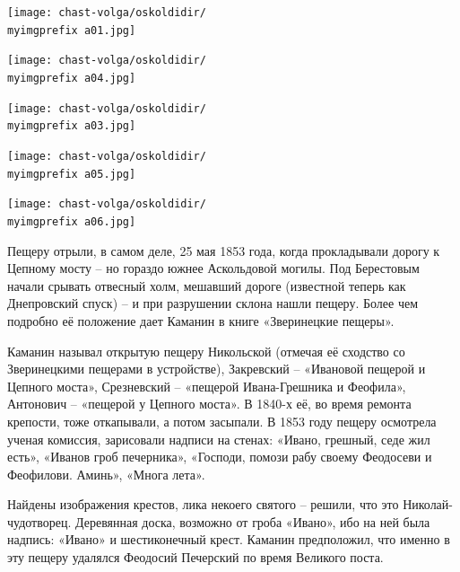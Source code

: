 \newpage
\vspace*{\fill}
\begin{center}
\texttt{[image: chast-volga/oskoldidir/\\myimgprefix a01.jpg]}
\end{center}

\begin{center}
\texttt{[image: chast-volga/oskoldidir/\\myimgprefix a04.jpg]}
\end{center}
\vspace*{\fill}
\newpage
\vspace*{\fill}
\begin{center}
\texttt{[image: chast-volga/oskoldidir/\\myimgprefix a03.jpg]}
\end{center}

\begin{center}
\texttt{[image: chast-volga/oskoldidir/\\myimgprefix a05.jpg]}
\end{center}
\vspace*{\fill}
\newpage

\begin{center}
\texttt{[image: chast-volga/oskoldidir/\\myimgprefix a06.jpg]}
\end{center}

Пещеру отрыли, в самом деле, 25 мая 1853 года, когда прокладывали дорогу к Цепному мосту – но гораздо южнее Аскольдовой могилы. Под Берестовым начали срывать отвесный холм, мешавший дороге (известной теперь как Днепровский спуск) – и при разрушении склона нашли пещеру. Более чем подробно её положение дает Каманин в книге «Зверинецкие пещеры». %

Каманин называл открытую пещеру Никольской (отмечая её сходство со Зверинецкими пещерами в устройстве), Закревский – «Ивановой пещерой и Цепного моста», Срезневский – «пещерой Ивана-Грешника и Феофила», Антонович – «пещерой у Цепного моста». В 1840-х её, во время ремонта крепости, тоже откапывали, а потом засыпали. В 1853 году пещеру осмотрела ученая комиссия, зарисовали надписи на стенах: «Ивано, грешный, седе жил есть», «Иванов гроб печерника», «Господи, помози рабу своему Феодосеви и Феофилови. Аминь», «Многа лета». 

Найдены изображения крестов, лика некоего святого – решили, что это Николай-чудотворец. Деревянная доска, возможно от гроба «Ивано», ибо на ней была надпись: «Ивано» и шестиконечный крест. Каманин предположил, что именно в эту пещеру удалялся Феодосий Печерский по время Великого поста.

